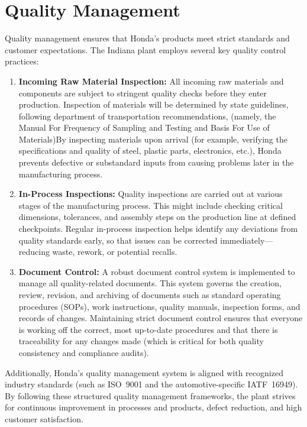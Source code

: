 \section{Quality Management}
Quality management ensures that Honda's products meet strict standards and customer expectations. The Indiana plant employs several key quality control practices:
\begin{enumerate}
    \item \textbf{Incoming Raw Material Inspection:} All incoming raw materials and components are subject to stringent quality checks before they enter production. Inspection of materials will be determined by state guidelines, following department of transportation recommendations, (namely, the Manual For Frequency of Sampling and Testing and Basis For Use of Materials)By inspecting materials upon arrival (for example, verifying the specifications and quality of steel, plastic parts, electronics, etc.), Honda prevents defective or substandard inputs from causing problems later in the manufacturing process. 
    \item \textbf{In-Process Inspections:} Quality inspections are carried out at various stages of the manufacturing process. This might include checking critical dimensions, tolerances, and assembly steps on the production line at defined checkpoints. Regular in-process inspection helps identify any deviations from quality standards early, so that issues can be corrected immediately---reducing waste, rework, or potential recalls.
    \item \textbf{Document Control:} A robust document control system is implemented to manage all quality-related documents. This system governs the creation, review, revision, and archiving of documents such as standard operating procedures (SOPs), work instructions, quality manuals, inspection forms, and records of changes. Maintaining strict document control ensures that everyone is working off the correct, most up-to-date procedures and that there is traceability for any changes made (which is critical for both quality consistency and compliance audits).
\end{enumerate}

Additionally, Honda’s quality management system is aligned with recognized industry standards (such as ISO~9001 and the automotive-specific IATF~16949). By following these structured quality management frameworks, the plant strives for continuous improvement in processes and products, defect reduction, and high customer satisfaction.

